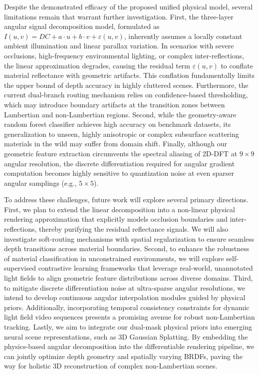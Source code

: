 \documentclass[lettersize,journal]{IEEEtran}
\begin{document}
Despite the demonstrated efficacy of the proposed unified physical model, several limitations remain that warrant further investigation. First, the three-layer angular signal decomposition model, formulated as $I(u,v) = DC + a\cdot u + b\cdot v + \varepsilon(u,v)$, inherently assumes a locally constant ambient illumination and linear parallax variation. In scenarios with severe occlusions, high-frequency environmental lighting, or complex inter-reflections, the linear approximation degrades, causing the residual term $\varepsilon(u,v)$ to conflate material reflectance with geometric artifacts. This conflation fundamentally limits the upper bound of depth accuracy in highly cluttered scenes. Furthermore, the current dual-branch routing mechanism relies on confidence-based thresholding, which may introduce boundary artifacts at the transition zones between Lambertian and non-Lambertian regions. Second, while the geometry-aware random forest classifier achieves high accuracy on benchmark datasets, its generalization to unseen, highly anisotropic or complex subsurface scattering materials in the wild may suffer from domain shift. Finally, although our geometric feature extraction circumvents the spectral aliasing of 2D-DFT at $9 \times 9$ angular resolution, the discrete differentiation required for angular gradient computation becomes highly sensitive to quantization noise at even sparser angular samplings (e.g., $5 \times 5$).

To address these challenges, future work will explore several primary directions. First, we plan to extend the linear decomposition into a non-linear physical rendering approximation that explicitly models occlusion boundaries and inter-reflections, thereby purifying the residual reflectance signals. We will also investigate soft-routing mechanisms with spatial regularization to ensure seamless depth transitions across material boundaries. Second, to enhance the robustness of material classification in unconstrained environments, we will explore self-supervised contrastive learning frameworks that leverage real-world, unannotated light fields to align geometric feature distributions across diverse domains. Third, to mitigate discrete differentiation noise at ultra-sparse angular resolutions, we intend to develop continuous angular interpolation modules guided by physical priors. Additionally, incorporating temporal consistency constraints for dynamic light field video sequences presents a promising avenue for robust non-Lambertian tracking. Lastly, we aim to integrate our dual-mask physical priors into emerging neural scene representations, such as 3D Gaussian Splatting. By embedding the physics-based angular decomposition into the differentiable rendering pipeline, we can jointly optimize depth geometry and spatially varying BRDFs, paving the way for holistic 3D reconstruction of complex non-Lambertian scenes.



\end{document}
